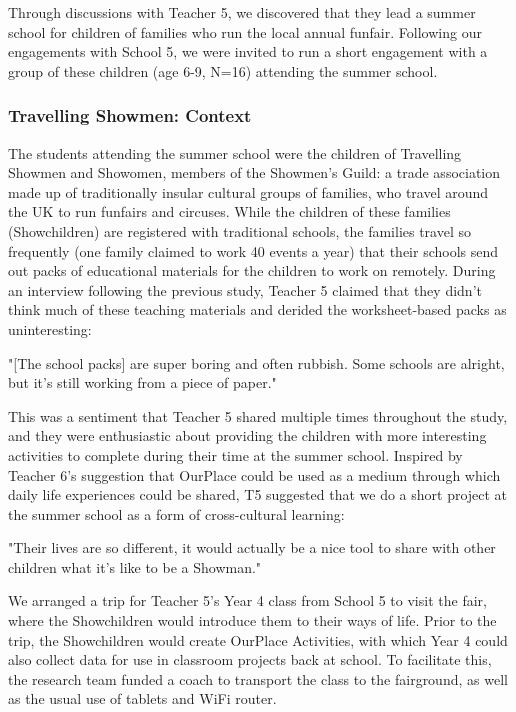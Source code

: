 Through discussions with Teacher 5, we discovered that they lead a summer school for children of families who run the local annual funfair. Following our engagements with School 5, we were invited to run a short engagement with a group of these children (age 6-9, N=16) attending the summer school.

\subsubsection{Travelling Showmen: Context}
The students attending the summer school were the children of Travelling Showmen and Showomen, members of the Showmen's Guild: a trade association made up of traditionally insular cultural groups of families, who travel around the UK to run funfairs and circuses. While the children of these families (Showchildren) are registered with traditional schools, the families travel so frequently (one family claimed to work 40 events a year) that their schools send out packs of educational materials for the children to work on remotely. During an interview following the previous study, Teacher 5 claimed that they didn't think much of these teaching materials and derided the worksheet-based packs as uninteresting: 

\begin{displayquote}
"[The school packs] are super boring and often rubbish. Some schools are alright, but it's still working from a piece of paper."
\end{displayquote}

This was a sentiment that Teacher 5 shared multiple times throughout the study, and they were enthusiastic about providing the children with more interesting activities to complete during their time at the summer school. Inspired by Teacher 6's suggestion that OurPlace could be used as a medium through which daily life experiences could be shared, T5 suggested that we do a short project at the summer school as a form of cross-cultural learning: 

\begin{displayquote}
"Their lives are so different, it would actually be a nice tool to share with other children what it's like to be a Showman."
\end{displayquote}

We arranged a trip for Teacher 5's Year 4 class from School 5 to visit the fair, where the Showchildren would introduce them to their ways of life. Prior to the trip, the Showchildren would create OurPlace Activities, with which Year 4 could also collect data for use in classroom projects back at school. To facilitate this, the research team funded a coach to transport the class to the fairground, as well as the usual use of tablets and WiFi router.

